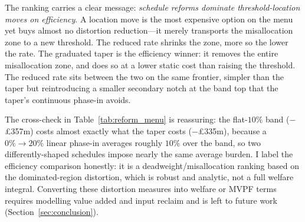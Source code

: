The ranking carries a clear message: \emph{schedule reforms dominate
threshold-location moves on efficiency}. A location move is the most expensive
option on the menu yet buys almost no distortion reduction---it merely transports
the misallocation zone to a new threshold. The reduced rate shrinks the zone, more
so the lower the rate. The graduated taper is the efficiency winner: it removes the
entire misallocation zone, and does so at a lower static cost than raising the
threshold. The reduced rate sits between the two on the same frontier, simpler than
the taper but reintroducing a smaller secondary notch at the band top that the
taper's continuous phase-in avoids.

The cross-check in Table~\ref{tab:reform_menu} is reassuring: the flat-$10\%$ band
(\(-\)\pounds357m) costs almost exactly what the taper costs
(\(-\)\pounds335m), because a $0\%\to20\%$ linear phase-in averages roughly $10\%$
over the band, so two differently-shaped schedules impose nearly the same average
burden. I label the efficiency comparison honestly: it is a
deadweight/misallocation ranking based on the dominated-region distortion, which is
robust and analytic, not a full welfare integral. Converting these distortion
measures into welfare or MVPF terms requires modelling value added and input
reclaim and is left to future work (Section~\ref{sec:conclusion}).
